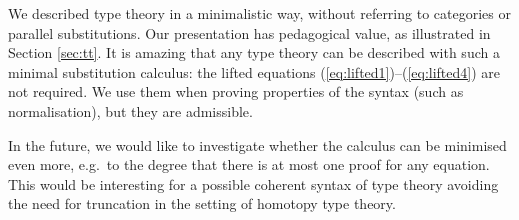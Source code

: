 \documentclass[a4paper,UKenglish]{article}
\newcommand{\Sub}{\mathsf{Sub}}
\newcommand{\Type}{\mathsf{Type}}
\begin{document}
We described type theory in a minimalistic way, without referring to
categories or parallel substitutions. Our presentation has pedagogical
value, as illustrated in Section \ref{sec:tt}.
%
It is amazing that any type theory can be described with such a
minimal substitution calculus: the lifted equations
(\ref{eq:lifted1})--(\ref{eq:lifted4}) are not required. We use them
when proving properties of the syntax (such as normalisation), but
they are admissible.

In the future, we would like to investigate whether the calculus can
be minimised even more, e.g.\ to the degree that there is at most one
proof for any equation. This would be interesting for a possible
coherent syntax of type theory avoiding the need for truncation in the
setting of homotopy type theory.

% 
\end{document}

